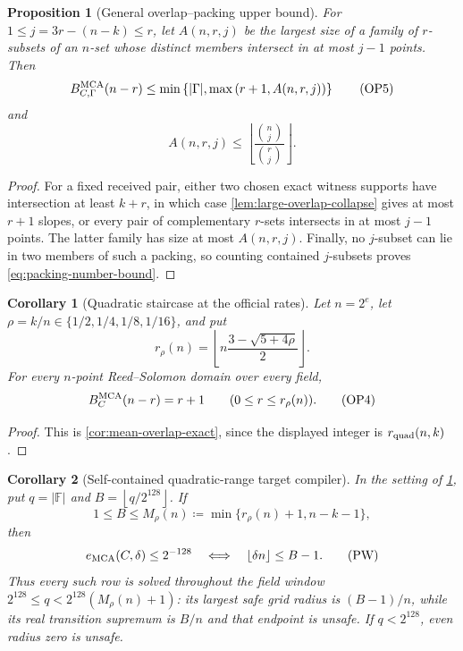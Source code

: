 \documentclass[11pt,a4paper]{amsart}
\numberwithin{equation}{section}
\newtheorem{proposition}[proposition]{Proposition}
\newtheorem{corollary}[corollary]{Corollary}
\theoremstyle{remark}
\newcommand{\F}{\mathbb F}
\newcommand{\abs}[1]{\lvert #1\rvert}
\newcommand{\floor}[1]{\left\lfloor #1\right\rfloor}
\newcommand{\defeq}{\coloneqq}
\begin{document}
\begin{proposition}[General overlap--packing upper bound]
\label{prop:general-overlap-packing-upper}
For \(1\le j=3r-(n-k)\le r\), let \(A(n,r,j)\) be the largest size of a
family of \(r\)-subsets of an \(n\)-set whose distinct members intersect
in at most \(j-1\) points.  Then
\[
 B_{C,\Gamma}^{\rm MCA}(n-r)
 \le\min\left\{\abs\Gamma,
     \max\left(r+1,A(n,r,j)\right)\right\}          \tag{OP5}
\label{eq:general-overlap-packing-upper}
\]
and
\[
 A(n,r,j)\le
 \floor{\frac{\binom nj}{\binom rj}}.              \tag{OP6}
\label{eq:packing-number-bound}
\]
\end{proposition}

\begin{proof}
For a fixed received pair, either two chosen exact witness supports have
intersection at least \(k+r\), in which case
\cref{lem:large-overlap-collapse} gives at most \(r+1\) slopes, or every
pair of complementary \(r\)-sets intersects in at most \(j-1\) points.
The latter family has size at most \(A(n,r,j)\).  Finally, no \(j\)-subset
can lie in two members of such a packing, so counting contained
\(j\)-subsets proves \eqref{eq:packing-number-bound}.
\end{proof}

\begin{corollary}[Quadratic staircase at the official rates]
\label{thm:prize-rate-overlap}
Let \(n=2^e\), let
\(\rho=k/n\in\{1/2,1/4,1/8,1/16\}\), and put
\[
 r_\rho(n)=\floor{
 n\frac{3-\sqrt{5+4\rho}}2}.
\]
For every \(n\)-point Reed--Solomon domain over every field,
\[
 B_C^{\rm MCA}(n-r)=r+1
 \qquad(0\le r\le r_\rho(n)).                     \tag{OP4}
\label{eq:prize-rate-staircase}
\]
\end{corollary}

\begin{proof}
This is \cref{cor:mean-overlap-exact}, since the displayed integer is
\(r_{\rm quad}(n,k)\).
\end{proof}

\begin{corollary}[Self-contained quadratic-range target compiler]
\label{cor:prize-window-compiler}
In the setting of \cref{thm:prize-rate-overlap}, put
\(q=\abs\F\) and \(B=\floor{q/2^{128}}\).  If
\[
 1\le B\le M_\rho(n)
 \defeq\min\{r_\rho(n)+1,n-k-1\},
\]
then
\[
 e_{\rm MCA}(C,\delta)\le2^{-128}
 \quad\Longleftrightarrow\quad
 \floor{\delta n}\le B-1.                        \tag{PW}
\label{eq:prize-window-iff}
\]
Thus every such row is solved throughout the field window
\(2^{128}\le q<2^{128}(M_\rho(n)+1)\): its largest safe grid radius is
\((B-1)/n\), while its real transition supremum is \(B/n\) and that
endpoint is unsafe.  If \(q<2^{128}\), even radius zero is unsafe.
\end{corollary}
\end{document}
